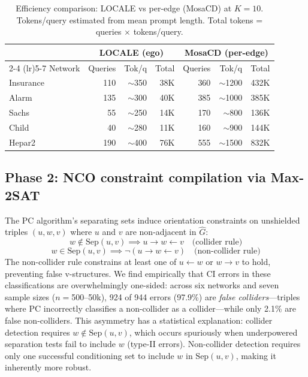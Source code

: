\documentclass{article} %
\begin{document}
\begin{table}[t]
\centering
\caption{Efficiency comparison: LOCALE vs per-edge (MosaCD) at $K{=}10$. Tokens/query estimated from mean prompt length. Total tokens = queries $\times$ tokens/query.}
\label{tab:efficiency}
\small
\begin{tabular}{lrrrrrr}
\toprule
 & \multicolumn{3}{c}{LOCALE (ego)} & \multicolumn{3}{c}{MosaCD (per-edge)} \\
\cmidrule(lr){2-4} \cmidrule(lr){5-7}
Network & Queries & Tok/q & Total & Queries & Tok/q & Total \\
\midrule
Insurance & 110 & $\sim$350 & 38K & 360 & $\sim$1200 & 432K \\
Alarm     & 135 & $\sim$300 & 40K & 385 & $\sim$1000 & 385K \\
Sachs     & 55  & $\sim$250 & 14K & 170 & $\sim$800  & 136K \\
Child     & 40  & $\sim$280 & 11K & 160 & $\sim$900  & 144K \\
Hepar2    & 190 & $\sim$400 & 76K & 555 & $\sim$1500 & 832K \\
\bottomrule
\end{tabular}
\end{table}

\subsection{Phase 2: NCO constraint compilation via Max-2SAT}

The PC algorithm's separating sets induce orientation constraints on unshielded triples $(u, w, v)$ where $u$ and $v$ are non-adjacent in $\hat{G}$:
\begin{equation}
    w \notin \text{Sep}(u, v) \implies u \to w \leftarrow v \quad \text{(collider rule)}
\end{equation}
\begin{equation}
    w \in \text{Sep}(u, v) \implies \neg(u \to w \leftarrow v) \quad \text{(non-collider rule)}
\end{equation}
The non-collider rule constrains at least one of $u \leftarrow w$ or $w \to v$ to hold, preventing false v-structures. We find empirically that CI errors in these classifications are overwhelmingly one-sided: across six networks and seven sample sizes ($n{=}$500--50k), 924 of 944 errors (97.9\%) are \textit{false colliders}---triples where PC incorrectly classifies a non-collider as a collider---while only 2.1\% are false non-colliders. This asymmetry has a statistical explanation: collider detection requires $w \notin \text{Sep}(u,v)$, which occurs spuriously when underpowered separation tests fail to include $w$ (type-II errors). Non-collider detection requires only one successful conditioning set to include $w$ in $\text{Sep}(u,v)$, making it inherently more robust.
\end{document}
